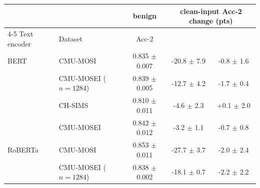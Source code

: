 
\begin{tabular}{llccc}
\toprule
 & & benign & \multicolumn{2}{c}{clean-input Acc-2 change (pts)} \\
\cmidrule(lr){4-5}
Text encoder & Dataset & Acc-2 & \tokenlevel{} & \modlevel{} \\
\midrule
BERT & CMU-MOSI & 0.835 $\pm$ 0.007 & -20.8 $\pm$ 7.9 & -0.8 $\pm$ 1.6 \\
 & CMU-MOSEI ($n{=}1284$) & 0.839 $\pm$ 0.005 & -12.7 $\pm$ 4.2 & -1.7 $\pm$ 0.4 \\
 & CH-SIMS & 0.810 $\pm$ 0.011 & -4.6 $\pm$ 2.3 & +0.1 $\pm$ 2.0 \\
 & CMU-MOSEI & 0.842 $\pm$ 0.012 & -3.2 $\pm$ 1.1 & -0.7 $\pm$ 0.8 \\
\addlinespace
RoBERTa & CMU-MOSI & 0.853 $\pm$ 0.011 & -27.7 $\pm$ 3.7 & -2.0 $\pm$ 2.4 \\
 & CMU-MOSEI ($n{=}1284$) & 0.838 $\pm$ 0.002 & -18.1 $\pm$ 0.7 & -2.2 $\pm$ 2.2 \\
\bottomrule
\end{tabular}

